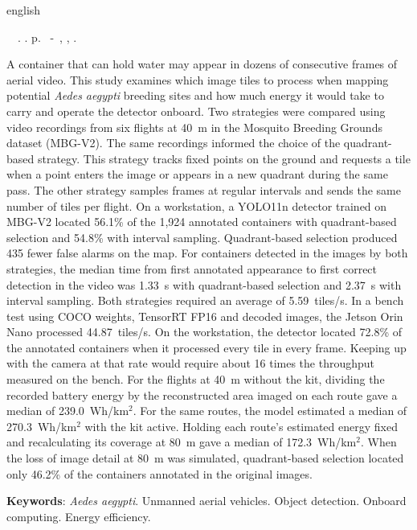 \begin{resumo}[Abstract]
 \begin{otherlanguage*}{english}
	\begin{flushleft}
		\setlength{\absparsep}{0pt} %
 		\SingleSpacing
 		\imprimirautorabr~~\textbf{\imprimirtitleabstract}.	\imprimirdata.  \pageref{LastPage} p.
		\imprimirtipotrabalhoabs~-~\imprimirinstituicao, \imprimirlocal, 	\imprimirdata.
	\end{flushleft}
	\OnehalfSpacing
A container that can hold water may appear in dozens of consecutive frames of aerial video. This study examines which image tiles to process when mapping potential \textit{Aedes aegypti} breeding sites and how much energy it would take to carry and operate the detector onboard. Two strategies were compared using video recordings from six flights at 40~m in the Mosquito Breeding Grounds dataset (MBG-V2). The same recordings informed the choice of the quadrant-based strategy. This strategy tracks fixed points on the ground and requests a tile when a point enters the image or appears in a new quadrant during the same pass. The other strategy samples frames at regular intervals and sends the same number of tiles per flight. On a workstation, a YOLO11n detector trained on MBG-V2 located 56.1\% of the 1,924 annotated containers with quadrant-based selection and 54.8\% with interval sampling. Quadrant-based selection produced 435 fewer false alarms on the map. For containers detected in the images by both strategies, the median time from first annotated appearance to first correct detection in the video was 1.33~s with quadrant-based selection and 2.37~s with interval sampling. Both strategies required an average of 5.59~tiles/s. In a bench test using COCO weights, TensorRT FP16 and decoded images, the Jetson Orin Nano processed 44.87~tiles/s. On the workstation, the detector located 72.8\% of the annotated containers when it processed every tile in every frame. Keeping up with the camera at that rate would require about 16 times the throughput measured on the bench. For the flights at 40~m without the kit, dividing the recorded battery energy by the reconstructed area imaged on each route gave a median of 239.0~Wh/km$^2$. For the same routes, the model estimated a median of 270.3~Wh/km$^2$ with the kit active. Holding each route's estimated energy fixed and recalculating its coverage at 80~m gave a median of 172.3~Wh/km$^2$. When the loss of image detail at 80~m was simulated, quadrant-based selection located only 46.2\% of the containers annotated in the original images.

\textbf{Keywords}: \textit{Aedes aegypti}. Unmanned aerial vehicles. Object detection. Onboard computing. Energy efficiency.
\end{otherlanguage*}
\end{resumo}
